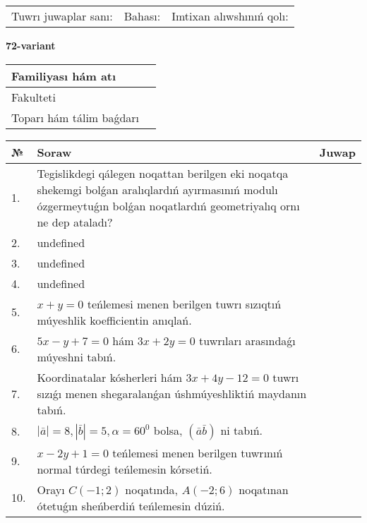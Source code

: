 \documentclass{article}
\begin{document}
\vspace{0.7cm}

\begin{tabular}{lll}
Tuwrı juwaplar sanı: \underline{\hspace{1cm}} & 
Bahası: \underline{\hspace{1cm}} & 
Imtixan alıwshınıń qolı: \underline{\hspace{2cm}} \\
\end{tabular}

\egroup

\newpage


\textbf{72-variant}\\

\bgroup
\def\arraystretch{1.6} %

\begin{tabular}{|m{5.7cm}|m{9.5cm}|}
\hline
Familiyası hám atı & \\
\hline
Fakulteti  & \\
\hline
Toparı hám tálim baǵdarı  & \\
\hline
\end{tabular}

\vspace{0.7cm}

\begin{tabular}{|m{0.7cm}|m{10cm}|m{4cm}|}
\hline
№ & Soraw & Juwap \\
\hline
1. & Tegislikdegi qálegen noqattan berilgen eki noqatqa shekemgi bolǵan aralıqlardıń ayırmasınıń modulı ózgermeytuǵın bolǵan noqatlardıń geometriyalıq ornı ne dep ataladı? &  \\
\hline
2. & undefined &  \\
\hline
3. & undefined &  \\
\hline
4. & undefined &  \\
\hline
5. & \(x + y = 0\) teńlemesi menen berilgen tuwrı sızıqtıń múyeshlik koefficientin anıqlań. &  \\
\hline
6. & \(5 x - y + 7 = 0\) hám \(3 x + 2 y = 0\) tuwrıları arasındaǵı múyeshni tabıń. &  \\
\hline
7. & Koordinatalar kósherleri hám \( 3 x + 4 y - 12 = 0 \) tuwrı sızıǵı menen shegaralanǵan úshmúyeshliktiń maydanın tabıń. &  \\
\hline
8. & \(\left| \bar{a} \right| = 8, \left| \bar{b} \right| = 5, \alpha = 60^{0}\) bolsa, \(( \bar{a}\bar{b} )\) ni tabıń. &  \\
\hline
9. & \(x - 2 y + 1 = 0\) teńlemesi menen berilgen tuwrınıń normal túrdegi teńlemesin kórsetiń. &  \\
\hline
10. & Orayı \(C (- 1;2)\) noqatında, \(A (- 2;6 )\) noqatınan ótetuǵın sheńberdiń teńlemesin dúziń. & \\
\hline
\end{tabular}
\end{document}

